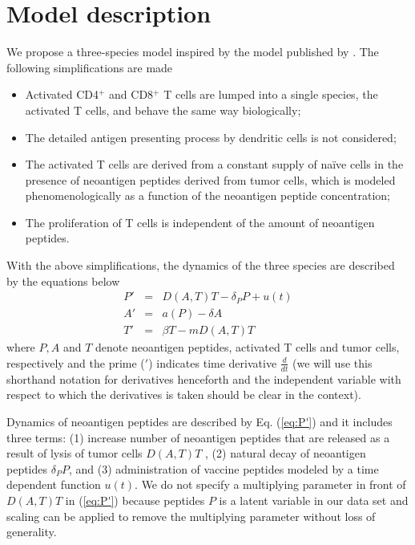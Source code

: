 \documentclass[review,authoryear]{elsarticle}
\begin{document}
\section{Model description \label{sec:A-simplified-model}}
We propose a three-species model inspired by the model published by \cite{Messan2021}. The following simplifications are made
\begin{itemize}
\item Activated CD4$^{+}$ and CD8$^{+}$ T cells are lumped into a single species, the activated T cells, and behave the same way biologically;
\item The detailed antigen presenting process by dendritic cells is not considered;
\item The activated T cells are derived from a constant supply of na\"ive cells in the presence of neoantigen peptides derived from tumor cells, which is modeled phenomenologically as a function of the neoantigen peptide concentration;
\item The proliferation of T cells is independent of the amount of neoantigen peptides.
\end{itemize} 
With the above simplifications, the dynamics of the three species are described by the equations below 
\begin{subequations}\label{eq:3sp-model}
\begin{eqnarray} 
P' & = & D(A,T)T-\delta_{P}P+u(t)\label{eq:P'}\\
A' & = & a(P)-\delta A\label{eq:A'}\\
T' & = & \beta T-mD(A,T)T\label{eq:T'}
\end{eqnarray}
\end{subequations}
where $P, A$ and $T$ denote neoantigen peptides,
activated T cells and tumor cells, respectively and the prime ($'$) indicates time derivative $\frac{d}{dt}$ (we will
use this shorthand notation for derivatives henceforth and the independent variable with respect to which the derivatives is taken should be clear in the context). 

Dynamics of neoantigen peptides are described by Eq. (\ref{eq:P'}) and it includes three terms: (1) increase number of neoantigen peptides that are released as a result of lysis of tumor cells $D(A,T)T$ \citep{Konstorum2017}, (2) natural decay of neoantigen peptides $\delta_P P$, and (3) administration of vaccine peptides modeled by a time dependent function $u(t)$. We do not specify a multiplying parameter in front of $D(A,T)T$ in
(\ref{eq:P'}) because peptides $P$ is a latent variable in our data set and scaling
can be applied to remove the multiplying parameter without loss of
generality.  
\end{document}
